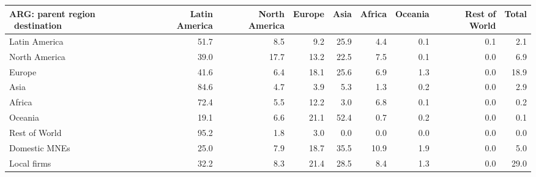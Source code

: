 \begin{tabular}{lrrrrrrrr}
\toprule
ARG: parent region \ destination & Latin America & North America & Europe & Asia & Africa & Oceania & Rest of World & Total \\
\midrule
Latin America & 51.7 & 8.5 & 9.2 & 25.9 & 4.4 & 0.1 & 0.1 & 2.1 \\
North America & 39.0 & 17.7 & 13.2 & 22.5 & 7.5 & 0.1 & 0.0 & 6.9 \\
Europe & 41.6 & 6.4 & 18.1 & 25.6 & 6.9 & 1.3 & 0.0 & 18.9 \\
Asia & 84.6 & 4.7 & 3.9 & 5.3 & 1.3 & 0.2 & 0.0 & 2.9 \\
Africa & 72.4 & 5.5 & 12.2 & 3.0 & 6.8 & 0.1 & 0.0 & 0.2 \\
Oceania & 19.1 & 6.6 & 21.1 & 52.4 & 0.7 & 0.2 & 0.0 & 0.1 \\
Rest of World & 95.2 & 1.8 & 3.0 & 0.0 & 0.0 & 0.0 & 0.0 & 0.0 \\
Domestic MNEs & 25.0 & 7.9 & 18.7 & 35.5 & 10.9 & 1.9 & 0.0 & 5.0 \\
Local firms & 32.2 & 8.3 & 21.4 & 28.5 & 8.4 & 1.3 & 0.0 & 29.0 \\
\bottomrule
\end{tabular}
